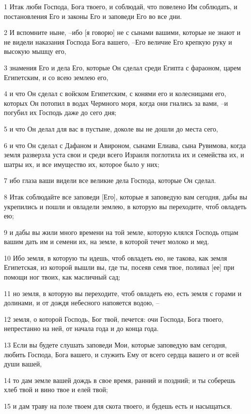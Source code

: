 \par 1 Итак люби Господа, Бога твоего, и соблюдай, что повелено Им соблюдать, и постановления Его и законы Его и заповеди Его во все дни.
\par 2 И вспомните ныне, --ибо [я говорю] не с сынами вашими, которые не знают и не видели наказания Господа Бога вашего, --Его величие Его крепкую руку и высокую мышцу его,
\par 3 знамения Его и дела Его, которые Он сделал среди Египта с фараоном, царем Египетским, и со всею землею его,
\par 4 и что Он сделал с войском Египетским, с конями его и колесницами его, которых Он потопил в водах Чермного моря, когда они гнались за вами, --и погубил их Господь даже до сего дня;
\par 5 и что Он делал для вас в пустыне, доколе вы не дошли до места сего,
\par 6 и что Он сделал с Дафаном и Авироном, сынами Елиава, сына Рувимова, когда земля разверзла уста свои и среди всего Израиля поглотила их и семейства их, и шатры их, и все имущество их, которое было у них;
\par 7 ибо глаза ваши видели все великие дела Господа, которые Он сделал.
\par 8 Итак соблюдайте все заповеди [Его], которые я заповедую вам сегодня, дабы вы укрепились и пошли и овладели землею, в которую вы переходите, чтоб овладеть ею;
\par 9 и дабы вы жили много времени на той земле, которую клялся Господь отцам вашим дать им и семени их, на земле, в которой течет молоко и мед.
\par 10 Ибо земля, в которую ты идешь, чтоб овладеть ею, не такова, как земля Египетская, из которой вышли вы, где ты, посеяв семя твое, поливал [ее] при помощи ног твоих, как масличный сад;
\par 11 но земля, в которую вы переходите, чтоб овладеть ею, есть земля с горами и долинами, и от дождя небесного напояется водою, --
\par 12 земля, о которой Господь, Бог твой, печется: очи Господа, Бога твоего, непрестанно на ней, от начала года и до конца года.
\par 13 Если вы будете слушать заповеди Мои, которые заповедую вам сегодня, любить Господа, Бога вашего, и служить Ему от всего сердца вашего и от всей души вашей,
\par 14 то дам земле вашей дождь в свое время, ранний и поздний; и ты соберешь хлеб твой и вино твое и елей твой;
\par 15 и дам траву на поле твоем для скота твоего, и будешь есть и насыщаться.
